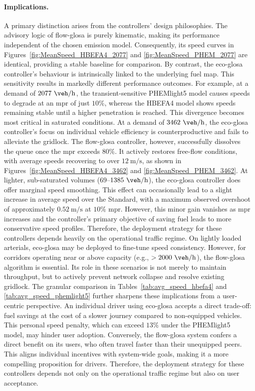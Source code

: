 \paragraph{Implications.}
A primary distinction arises from the controllers' design philosophies. The advisory logic of \ac{flow-glosa} is purely kinematic, making its performance independent of the chosen emission model. Consequently, its speed curves in Figures~\vref{fig:MeanSpeed_HBEFA4_2077} and \vref{fig:MeanSpeed_PHEM_2077} are identical, providing a stable baseline for comparison. By contrast, the \ac{eco-glosa} controller's behaviour is intrinsically linked to the underlying fuel map. This sensitivity results in markedly different performance outcomes. For example, at a demand of $2077~\unit{\veh\per\hour}$, the transient-sensitive PHEMlight5 model causes speeds to degrade at an \ac{mpr} of just $10\%$, whereas the HBEFA4 model shows speeds remaining stable until a higher penetration is reached.
This divergence becomes most critical in saturated conditions. At a demand of $3462~\unit{\veh\per\hour}$, the \ac{eco-glosa} controller's focus on individual vehicle efficiency is counterproductive and fails to alleviate the gridlock. The \ac{flow-glosa} controller, however, successfully dissolves the queue once the \ac{mpr} exceeds $80\%$. It actively restores free-flow conditions, with average speeds recovering to over $12~\unit{\metre\per\second}$, as shown in Figures~\vref{fig:MeanSpeed_HBEFA4_3462} and \vref{fig:MeanSpeed_PHEM_3462}.
At lighter, sub-saturated volumes ($69$--$1385~\unit{\veh\per\hour}$), the \ac{eco-glosa} controller does offer marginal speed smoothing. This effect can occasionally lead to a slight increase in average speed over the Standard, with a maximum observed overshoot of approximately $0.52~\unit{\metre\per\second}$ at $10\%$ \ac{mpr}. However, this minor gain vanishes as \ac{mpr} increases and the controller's primary objective of saving fuel leads to more conservative speed profiles. Therefore, the deployment strategy for these controllers depends heavily on the operational traffic regime. On lightly loaded arterials, \ac{eco-glosa} may be deployed to fine-tune speed consistency. However, for corridors operating near or above capacity (e.g., $> 2000~\unit{\veh\per\hour}$), the \ac{flow-glosa} algorithm is essential. Its role in these scenarios is not merely to maintain throughput, but to actively prevent network collapse and resolve existing gridlock.
\mynewline
The granular comparison in Tables~\vref{tab:avg_speed_hbefa4} and \vref{tab:avg_speed_phemlight5} further sharpens these implications from a user-centric perspective. An individual driver using \ac{eco-glosa} accepts a direct trade-off: fuel savings at the cost of a slower journey compared to non-equipped vehicles. This personal speed penalty, which can exceed $13\%$ under the PHEMlight5 model, may hinder user adoption. Conversely, the \ac{flow-glosa} system confers a direct benefit on its users, who often travel faster than their unequipped peers. This aligns individual incentives with system-wide goals, making it a more compelling proposition for drivers. Therefore, the deployment strategy for these controllers depends not only on the operational traffic regime but also on user acceptance.


